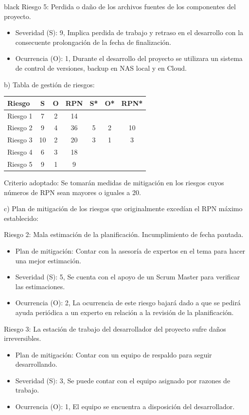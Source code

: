 \documentclass[11pt]{charter}
\begin{document}
\begin{consigna}{black}
Riesgo 5: Perdida o daño de los archivos fuentes de los componentes del proyecto. 
\begin{itemize}
\item Severidad (S): 9, Implica perdida de trabajo y retraso en el desarrollo con la consecuente prolongación de la fecha de finalización.
\item Ocurrencia (O): 1, Durante el desarrollo del proyecto se utilizara un sistema de control de versiones, backup en NAS local y en Cloud.
\end{itemize}	
							
\newpage		
b) Tabla de gestión de riesgos: 

\begin{table}[htpb]
\centering
\begin{tabularx}{\linewidth}{@{}|X|c|c|c|c|c|c|@{}}
\hline
\rowcolor[HTML]{418ddc} 
Riesgo & S & O & RPN & S* & O* & RPN* \\ \hline
Riesgo 1 & 7  & 2 & 14 &   &   &    \\
Riesgo 2 & 9  & 4 & 36 & 5 & 2 & 10 \\
Riesgo 3 & 10 & 2 & 20 & 3 & 1 & 3  \\
Riesgo 4 & 6  & 3 & 18 &   &   &    \\
Riesgo 5 & 9  & 1 & 9  &   &   &
\end{tabularx}
\end{table}

Criterio adoptado: 
Se tomarán medidas de mitigación en los riesgos cuyos números de RPN sean mayores o iguales a 20.
							
c) Plan de mitigación de los riesgos que originalmente excedían el RPN máximo establecido:		
					
Riesgo 2: Mala estimación de la planificación. Incumplimiento de fecha pautada.
\begin{itemize}
\item Plan de mitigación: Contar con la asesoría de expertos en el tema para hacer una mejor estimación.
\item Severidad (S): 5, Se cuenta con el apoyo de un Scrum Master para verificar las estimaciones.
\item Ocurrencia (O): 2, La ocurrencia de este riesgo bajará dado a que se pedirá ayuda periódica a un experto en relación a la revisión de la planificación.
\end{itemize}

Riesgo 3: La estación de trabajo del desarrollador del proyecto sufre daños irreversibles.  
\begin{itemize}
\item Plan de mitigación: Contar con un equipo de respaldo para seguir desarrollando.
\item Severidad (S): 3, Se puede contar con el equipo asignado por razones de trabajo.
\item Ocurrencia (O): 1, El equipo se encuentra a disposición del desarrollador.
\end{itemize}

\end{consigna}
\end{document}
